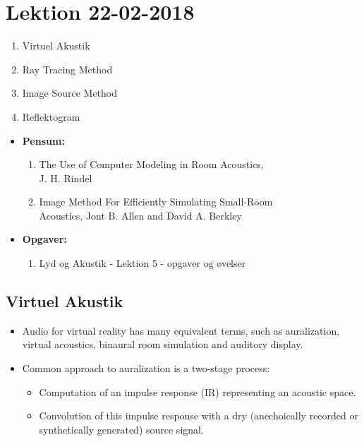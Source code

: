 \section{Lektion 22-02-2018}

\begin{enumerate}
	\item Virtuel Akustik
	\item Ray Tracing Method
	\item Image Source Method
	\item Reflektogram
\end{enumerate}

\begin{mdframed}[style=exampledefault]
	\begin{itemize}
		\item \textbf{Pensum:} 
		\begin{enumerate}
			\item The Use of Computer Modeling in Room Acoustics, \\J. H. Rindel
			\item Image Method For Efficiently Simulating Small-Room\\ Acoustics, Jont B. Allen and David A. Berkley
		\end{enumerate}
		\item \textbf{Opgaver:} 
		\begin{enumerate}
			\item Lyd og Akustik - Lektion 5 - opgaver og øvelser
		\end{enumerate}
	\end{itemize}
\end{mdframed}

\subsection{Virtuel Akustik}
\begin{itemize}
	\item Audio for virtual reality has many equivalent	terms, such as auralization, virtual acoustics, binaural room simulation and auditory display.
	\item Common approach to auralization is a two-stage process:
	\begin{itemize}
		\item Computation of an impulse response (IR) representing an acoustic space.
		\item Convolution of this impulse response with a dry (anechoically
		recorded or synthetically generated) source signal.
	\end{itemize} 
\end{itemize}

